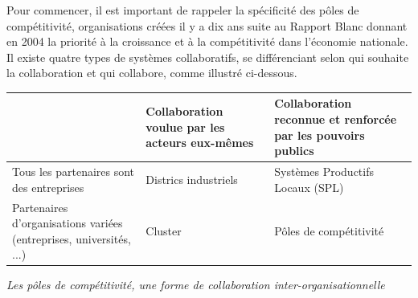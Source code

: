 \documentclass[a4paper,10pt]{report}
\begin{document}
		Pour commencer, il est important de rappeler la spécificité des pôles de compétitivité, organisations créées il y a dix ans suite au Rapport Blanc donnant en 2004 la priorité à la croissance et à la compétitivité dans l’économie nationale. Il existe quatre types de systèmes collaboratifs, se différenciant selon qui souhaite la collaboration et qui collabore, comme illustré ci-dessous.
		\begin{tabular}{|M{110pt}|M{100pt}|M{100pt}|}
			\hline
			& Collaboration voulue par les acteurs eux-mêmes & Collaboration reconnue et renforcée par les pouvoirs publics\\
			\hline
			Tous les partenaires sont des entreprises & Districs industriels & Systèmes Productifs Locaux (SPL)\\
			\hline
			Partenaires d'organisations variées (entreprises, universités, ...) & Cluster & Pôles de compétitivité\\
			\hline
		\end{tabular}
		\emph{Les pôles de compétitivité, une forme de collaboration inter-organisationnelle\\}
\end{document}
